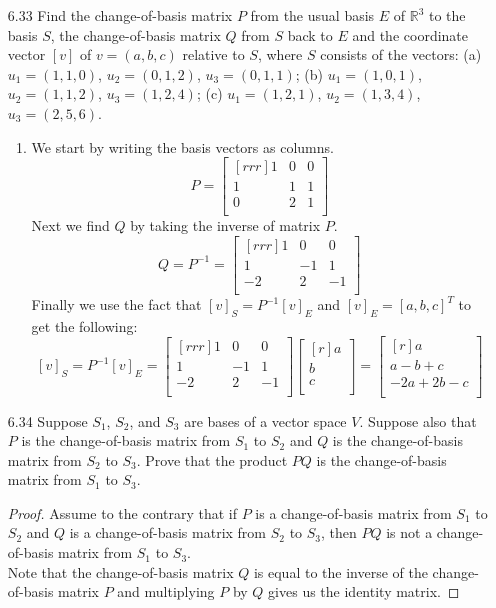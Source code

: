 \documentclass[12pt]{article}
\theoremstyle{definition}
\theoremstyle{plain}
\begin{document}
\begin{enumerate}
\item[6.33] Find the change-of-basis matrix $P$ from the usual basis $E$ of $\mathbb{R}^3$ to the basis $S$, the change-of-basis matrix $Q$ from $S$ back to $E$ and the coordinate vector $[v]$ of $v=(a,b,c)$ relative to $S$, where $S$ consists of the vectors: (a) $u_1=(1,1,0)$, $u_2=(0,1,2)$, $u_3=(0,1,1)$; (b) $u_1=(1,0,1)$, $u_2=(1,1,2)$, $u_3=(1,2,4)$; (c) $u_1=(1,2,1)$, $u_2=(1,3,4)$, $u_3=(2,5,6)$.
	\begin{enumerate}
	\item We start by writing the basis vectors as columns.
	\[ P = \begin{bmatrix}[rrr]1&0&0\\1&1&1\\0&2&1\\\end{bmatrix} \]
	Next we find $Q$ by taking the inverse of matrix $P$.
	\[ Q = P^{-1} = \begin{bmatrix}[rrr]1&0&0\\1&-1&1\\-2&2&-1\\\end{bmatrix} \]
	Finally we use the fact that $[v]_S = P^{-1}[v]_E$ and $[v]_E=[a,b,c]^T$ to get the following:
	\[ [v]_S=P^{-1}[v]_E = \begin{bmatrix}[rrr]1&0&0\\1&-1&1\\-2&2&-1\\\end{bmatrix}\begin{bmatrix}[r]a\\b\\c\\\end{bmatrix} = \begin{bmatrix}[r]a\\a-b+c\\-2a+2b-c\\\end{bmatrix} \]
	\end{enumerate}
	
\item[6.34] Suppose $S_1$, $S_2$, and $S_3$ are bases of a vector space $V$. Suppose also that $P$ is the change-of-basis matrix from $S_1$ to $S_2$ and $Q$ is the change-of-basis matrix from $S_2$ to $S_3$. Prove that the product $PQ$ is the change-of-basis matrix from $S_1$ to $S_3$.
	\begin{proof}
	Assume to the contrary that if $P$ is a change-of-basis matrix from $S_1$ to $S_2$ and $Q$ is a change-of-basis matrix from $S_2$ to $S_3$, then $PQ$ is not a change-of-basis matrix from $S_1$ to $S_3$.\\
	Note that the change-of-basis matrix $Q$ is equal to the inverse of the change-of-basis matrix $P$ and multiplying $P$ by $Q$ gives us the identity matrix.
	\end{proof}


\end{enumerate}
\end{document}
